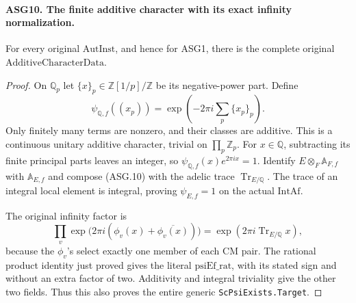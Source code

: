 \paragraph{ASG10. The finite additive character with its exact infinity normalization.}
\label{claim:ASG10}
For every original \(\mathrm{AutInst}\), and hence for ASG1,
there is the complete original \(\mathrm{AdditiveCharacterData}\).
\begin{proof}
On \(\mathbb Q_p\) let \(\{x\}_p\in\mathbb Z[1/p]/\mathbb Z\)
be its negative-power part.  Define
\[
 \psi_{\mathbb Q,f}((x_p))
       =\exp\!\left(-2\pi i\sum_p\{x_p\}_p\right).
\tag{ASG.10}
\]
Only finitely many terms are nonzero, and their classes are additive.
This is a continuous unitary additive character, trivial on
\(\prod_p\mathbb Z_p\).  For \(x\in\mathbb Q\), subtracting
its finite principal parts leaves an integer, so
\(\psi_{\mathbb Q,f}(x)e^{2\pi ix}=1\).
Identify \(E\otimes_F\mathbb A_{F,f}\) with
\(\mathbb A_{E,f}\) and compose (ASG.10) with the adelic trace
\(\operatorname{Tr}_{E/\mathbb Q}\).
The trace of an integral local element is integral, proving
\(\psi_{E,f}=1\) on the actual \(\mathrm{IntAf}\).

The original infinity factor is
\[
 \prod_v \exp\bigl(2\pi i(\phi_v(x)+\overline{\phi_v(x)})\bigr)
               =\exp(2\pi i\operatorname{Tr}_{E/\mathbb Q}x),
\]
because the \(\phi_v\)'s select exactly one member of each CM
pair.  The rational product identity just proved gives the literal
\(\mathrm{psiEf\_rat}\), with its stated sign and without an
extra factor of two.  Additivity and integral triviality give the other
two fields.  Thus this also proves the entire generic
\texttt{ScPsiExists.Target}.
\end{proof}

